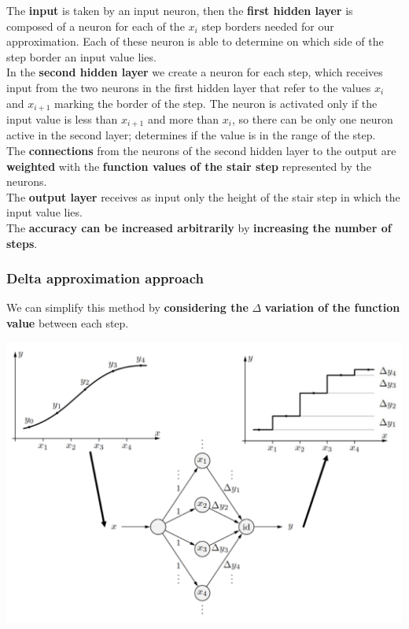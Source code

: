\documentclass[11pt]{article}
\begin{document}
		The \textbf{input} is taken by an input neuron, then the \textbf{first hidden layer} is composed of a neuron for each of the $x_i$ step borders needed for our approximation. Each of these neuron is able to determine on which side of the step border an input value lies.\\
		
		In the \textbf{second hidden layer} we create a neuron for each step, which receives input from the two neurons in the first hidden layer that refer to the values $x_i$ and $x_{i+1}$ marking the border of the step. The neuron is activated only if the input value is less than $x_{i+1}$ and more than $x_i$, so there can be only one neuron active in the second layer; determines if the value is in the range of the step.\\
		
		The \textbf{connections} from the neurons of the second hidden layer to the output are \textbf{weighted} with the \textbf{function values of the stair step} represented by the neurons.\\
		
		The \textbf{output layer} receives as input only the height of the stair step in which the input value lies.\\
		
		The \textbf{accuracy can be increased arbitrarily} by \textbf{increasing the number of steps}.
		
		\newpage
		
		\subsubsection{Delta approximation approach}
		We can simplify this method by \textbf{considering the} $\Delta$ \textbf{variation of the function value} between each step.\\
		
		\begin{center}
			\includegraphics[width=0.9\columnwidth]{img/NN/func2}
		\end{center}
		
\end{document}
